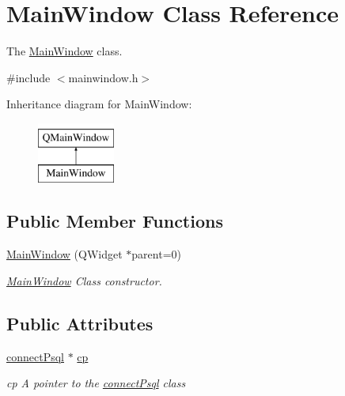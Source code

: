 \hypertarget{class_main_window}{}\section{Main\+Window Class Reference}
\label{class_main_window}


The \mbox{\hyperlink{class_main_window}{Main\+Window}} class.  




{\ttfamily \#include $<$mainwindow.\+h$>$}

Inheritance diagram for Main\+Window\+:\begin{figure}[H]
\begin{center}
\leavevmode
\includegraphics[height=2.000000cm]{class_main_window}
\end{center}
\end{figure}
\subsection*{Public Member Functions}
\begin{DoxyCompactItemize}
\item 
\mbox{\hyperlink{class_main_window_a8b244be8b7b7db1b08de2a2acb9409db}{Main\+Window}} (Q\+Widget $\ast$parent=0)
\begin{DoxyCompactList}\small\item\em \mbox{\hyperlink{class_main_window}{Main\+Window}} Class constructor. \end{DoxyCompactList}\end{DoxyCompactItemize}
\subsection*{Public Attributes}
\begin{DoxyCompactItemize}
\item 
\mbox{\label{class_main_window_af6a0a464b2432a13ece4953de0e66441}} 
\mbox{\hyperlink{classconnect_psql}{connect\+Psql}} $\ast$ \mbox{\hyperlink{class_main_window_af6a0a464b2432a13ece4953de0e66441}{cp}}
\begin{DoxyCompactList}\small\item\em cp A pointer to the \mbox{\hyperlink{classconnect_psql}{connect\+Psql}} class \end{DoxyCompactList}\end{DoxyCompactItemize}


